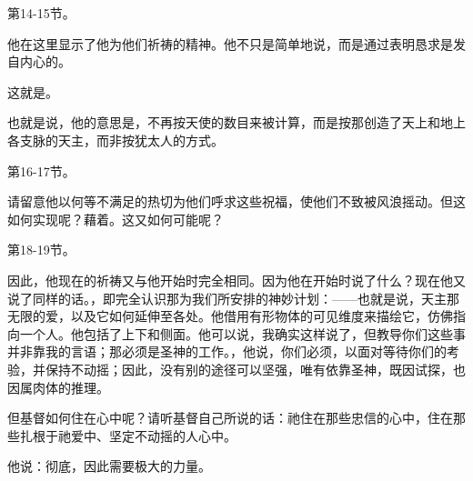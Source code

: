 第14-15节。\par

他在这里显示了他为他们祈祷的精神。他不只是简单地说，而是通过表明恳求是发自内心的。\par

这就是。\par

也就是说，他的意思是，不再按天使的数目来被计算，而是按那创造了天上和地上各支脉的天主，而非按犹太人的方式。\par

第16-17节。\par

请留意他以何等不满足的热切为他们呼求这些祝福，使他们不致被风浪摇动。但这如何实现呢？藉着。这又如何可能呢？\par

第18-19节。\par

因此，他现在的祈祷又与他开始时完全相同。因为他在开始时说了什么？现在他又说了同样的话。，即完全认识那为我们所安排的神妙计划：——也就是说，天主那无限的爱，以及它如何延伸至各处。他借用有形物体的可见维度来描绘它，仿佛指向一个人。他包括了上下和侧面。他可以说，我确实这样说了，但教导你们这些事并非靠我的言语；那必须是圣神的工作。，他说，你们必须，以面对等待你们的考验，并保持不动摇；因此，没有别的途径可以坚强，唯有依靠圣神，既因试探，也因属肉体的推理。\par

但基督如何住在心中呢？请听基督自己所说的话：祂住在那些忠信的心中，住在那些扎根于祂爱中、坚定不动摇的人心中。\par

他说：彻底，因此需要极大的力量。\par

\par

